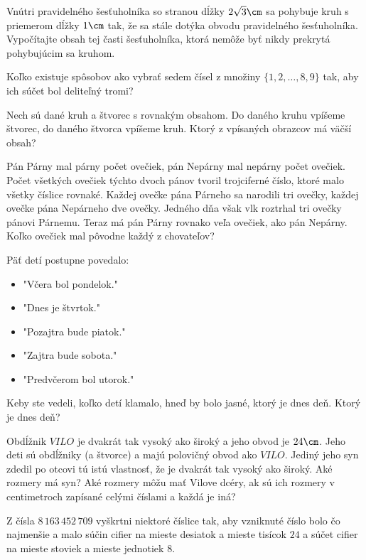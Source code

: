 {%
Vnútri pravidelného šesťuholníka so stranou dĺžky $2\sqrt3\cm$ sa
pohybuje kruh s priemerom dĺžky $1\cm$ tak, že sa stále dotýka
obvodu pravidelného šesťuholníka. Vypočítajte obsah tej časti
šesťuholníka, ktorá nemôže byť nikdy prekrytá pohybujúcim sa
kruhom.}

{%
Koľko existuje spôsobov ako vybrať sedem čísel z množiny $\{1, 2, \dots, 8, 9\}$ tak, aby ich
súčet bol deliteľný tromi?}

{%
Nech sú dané kruh a štvorec s rovnakým obsahom. Do daného kruhu vpíšeme štvorec, do
daného štvorca vpíšeme kruh. Ktorý z vpísaných obrazcov má väčší obsah?}

{%
Pán Párny mal párny počet ovečiek, pán Nepárny mal nepárny počet ovečiek. Počet všetkých
ovečiek týchto dvoch pánov tvoril trojciferné číslo, ktoré malo všetky číslice rovnaké. Každej
ovečke pána Párneho sa narodili tri ovečky, každej ovečke pána Nepárneho dve ovečky.
Jedného dňa však vlk roztrhal tri ovečky pánovi Párnemu. Teraz má pán Párny rovnako veľa
ovečiek, ako pán Nepárny. Koľko ovečiek mal pôvodne každý z chovateľov?}

{%
Päť detí postupne povedalo:
\begin{itemize}
\item "Včera bol pondelok."
\item "Dnes je štvrtok."
\item "Pozajtra bude piatok."
\item "Zajtra bude sobota."
\item "Predvčerom bol utorok."
\end{itemize}
Keby ste vedeli, koľko detí klamalo, hneď by bolo jasné, ktorý je dnes deň. Ktorý je dnes
deň?}

{%
Obdĺžnik $VILO$ je dvakrát tak vysoký ako široký a jeho obvod je $24\cm$. Jeho deti sú
obdĺžniky (a štvorce) a majú polovičný obvod ako $VILO$. Jediný jeho syn zdedil po otcovi tú
istú vlastnosť, že je dvakrát tak vysoký ako široký. Aké rozmery má syn? Aké rozmery môžu
mať Vilove dcéry, ak sú ich rozmery v centimetroch zapísané celými číslami a každá je
iná?}

{%
Z čísla $8\,163\,452\,709$ vyškrtni niektoré číslice tak, aby vzniknuté číslo bolo čo najmenšie a
malo súčin cifier na mieste desiatok a mieste tisícok $24$ a súčet cifier na mieste stoviek
a mieste jednotiek $8$.}

